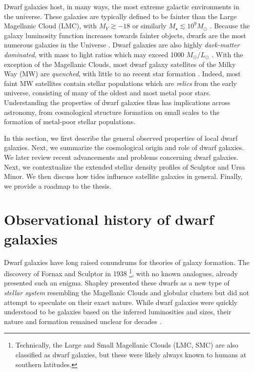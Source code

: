 Dwarf galaxies host, in many ways, the most extreme galactic
environments in the universe. These galaxies are typically defined to be
fainter than the Large Magellanic Cloud (LMC), with \(M_V \gtrsim -18\)
or similarly \(M_\star \lesssim 10^9 M_\odot\)
\citep[e.g.,][]{hodge1971, mcconnachie2012}. Because the galaxy
luminosity function increases towards fainter objects, dwarfs are the
most numerous galaxies in the Universe
\citep[e.g.,][]{blanton+2005, mao+2021}. Dwarf galaxies are also highly
\emph{dark-matter dominated}, with mass to light ratios which may exceed
1000 \(M_\odot/ L_\odot\) \citep[e.g.,][]{simon+geha2007, hayashi+2023}.
With the exception of the Magellanic Clouds, most dwarf galaxy
satellites of the Milky Way (MW) are \emph{quenched}, with little to no
recent star formation \citep[e.g.,][]{weisz+2014}. Indeed, most faint MW
satellites contain stellar populations which are \emph{relics} from the
early universe, consisting of many of the oldest and most metal poor
stars. Understanding the properties of dwarf galaxies thus has
implications across astronomy, from cosmological structure formation on
small scales to the formation of metal-poor stellar populations.

In this section, we first describe the general observed properties of
local dwarf galaxies. Next, we summarize the cosmological origin and
role of dwarf galaxies. We later review recent advancements and problems
concerning dwarf galaxies. Next, we contextualize the extended stellar
density profiles of Sculptor and Ursa Minor. We then discuss how tides
influence satellite galaxies in general. Finally, we provide a roadmap
to the thesis.

\section{Observational history of dwarf
galaxies}\label{observational-history-of-dwarf-galaxies}

Dwarf galaxies have long raised conundrums for theories of galaxy
formation. The discovery of Fornax and Sculptor in 1938
\citep{shapley1938}\footnote{Technically, the Large and Small Magellanic
  Clouds (LMC, SMC) are also classified as dwarf galaxies, but these
  were likely always known to humans at southern latitudes.}, with no
known analogues, already presented such an enigma. Shapley presented
these dwarfs as a new type of \emph{stellar system} resembling the
Magellanic Clouds and globular clusters but did not attempt to speculate
on their exact nature. While dwarf galaxies were quickly understood to
be galaxies based on the inferred luminosities and sizes, their nature
and formation remained unclear for decades
\citep[e.g.,][]{hodge1971, gallagher+wyse1994}.

